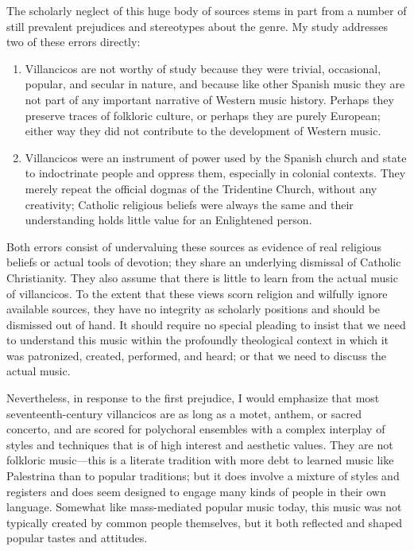 
The scholarly neglect of this huge body of sources stems in part from a
number of still prevalent prejudices and stereotypes about the genre.
My study addresses two of these errors directly:
\begin{enumerate}
    \item Villancicos are not worthy of study because they were trivial,
        occasional, popular, and secular in nature, and because like other
        Spanish music they are not part of any important narrative of Western
        music history.
        Perhaps they preserve traces of folkloric culture, or perhaps they are
        purely European; either way they did not contribute to the
        development of Western music.
    \item Villancicos were an instrument of power used by the Spanish church
        and state to indoctrinate people and oppress them, especially in
        colonial contexts.
        They merely repeat the official dogmas of the Tridentine Church,
        without any creativity; Catholic religious beliefs were always the same
        and their understanding holds little value for an Enlightened person.
\end{enumerate}
Both errors consist of undervaluing these sources as evidence of real religious
beliefs or actual tools of devotion; they share an underlying
dismissal of Catholic Christianity.
They also assume that there is little to learn from the actual music of
villancicos.
To the extent that these views scorn religion and wilfully ignore available
sources, they have no integrity as scholarly positions and should be dismissed
out of hand.
It should require no special pleading to insist that we need to understand this
music within the profoundly theological context in which it was patronized,
created, performed, and heard; or that we need to discuss the actual music.

Nevertheless, in response to the first prejudice, I would emphasize that most
seventeenth-century villancicos are as long as a motet, anthem, or sacred
concerto, and are scored for polychoral ensembles with a complex interplay of
styles and techniques that is of high interest and aesthetic values. 
They are not folkloric music---this is a literate tradition with more debt to
learned music like Palestrina than to popular traditions; but it does involve a
mixture of styles and registers and does seem designed to engage many kinds of
people in their own language.  
Somewhat like mass-mediated popular music today, this music was not typically
created by common people themselves, but it both reflected and shaped popular
tastes and attitudes.


